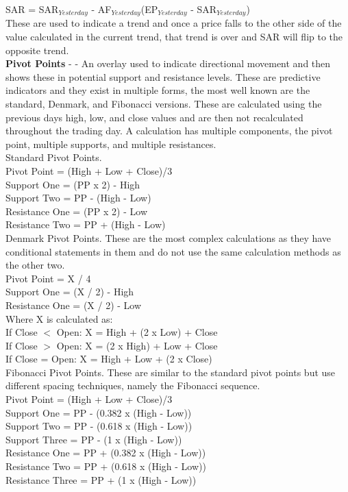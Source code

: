 \documentclass[12pt,a4paper]{article}
\begin{document}
\noindent
SAR = SAR$_{Yesterday}$ - AF$_{Yesterday}$(EP$_{Yesterday}$ - SAR$_{Yesterday}$) \\

\noindent
These are used to indicate a trend and once a price falls to the other side of the value calculated in the current trend, that trend is over and SAR will flip to the opposite trend. \\

\iffalse
[]
\fi

\noindent
\textbf{Pivot Points} - \cite{Murphy1999} - An overlay used to indicate directional movement and then shows these in potential support and resistance levels. These are predictive indicators and they exist in multiple forms, the most well known are the standard, Denmark, and Fibonacci versions. These are calculated using the previous days high, low, and close values and are then not recalculated throughout the trading day. A calculation has multiple components, the pivot point, multiple supports, and multiple resistances.\\

\noindent
Standard Pivot Points. \\
Pivot Point = (High + Low + Close)/3\\
Support One = (PP x 2) - High\\
Support Two = PP - (High - Low)\\
Resistance One = (PP x 2) - Low\\
Resistance Two = PP + (High - Low)\\

\noindent
Denmark Pivot Points. These are the most complex calculations as they have conditional statements in them and do not use the same calculation methods as the other two.\\
Pivot Point = X / 4\\
Support One = (X / 2) - High\\
Resistance One = (X / 2) - Low\\

\noindent
Where X is calculated as: \\
If Close $<$ Open: X = High + (2 x Low) + Close\\
If Close $>$ Open: X = (2 x High) + Low + Close\\
If Close = Open: X = High + Low + (2 x Close)\\

\noindent
Fibonacci Pivot Points. These are similar to the standard pivot points but use different spacing techniques, namely the Fibonacci sequence.\\
Pivot Point = (High + Low + Close)/3\\
Support One = PP - (0.382 x (High  -  Low))\\
Support Two = PP - (0.618 x (High  -  Low))\\
Support Three = PP - (1 x (High  -  Low))\\
Resistance One = PP + (0.382 x (High  -  Low))\\
Resistance Two = PP + (0.618 x (High  -  Low))\\
Resistance Three = PP + (1 x (High  -  Low))\\
\end{document}
